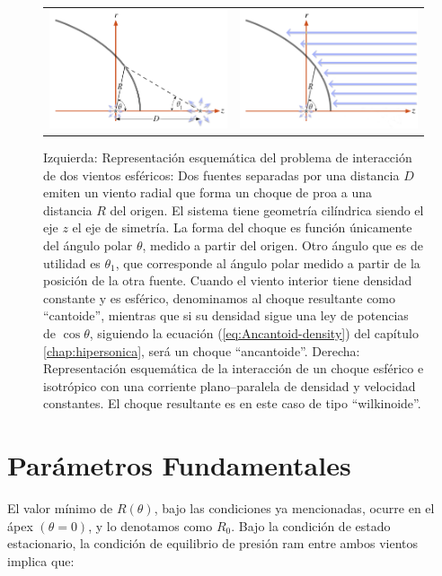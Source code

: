 \begin{figure}
  \begin{tabular}{lr}
    \includegraphics[width=0.45\linewidth]{./Figures/bowshock-crw-variables} &
    \includegraphics[width=0.45\linewidth]{./Figures/wilkinoid}
  \end{tabular}
  \caption{Izquierda: Representación esquemática del problema de interacción de dos vientos esféricos: Dos fuentes separadas por una distancia $D$ emiten un viento radial que forma un choque de proa a una distancia $R$ del origen. El sistema tiene geometría cilíndrica siendo el eje $z$ el eje de simetría. La forma del choque es función únicamente del ángulo polar $\theta$, medido a partir del origen. Otro ángulo que es de utilidad es $\theta_1$, que corresponde al ángulo polar medido a partir de la posición de la otra fuente. Cuando el viento interior tiene densidad constante y es esférico, denominamos al choque resultante como ``cantoide'', mientras que si su densidad sigue una ley de potencias de $\cos\theta$, siguiendo la ecuación (\ref{eq:Ancantoid-density}) del capítulo \ref{chap:hipersonica}, será un choque ``ancantoide''. Derecha: Representación esquemática de la interacción de un choque esférico e isotrópico con una corriente plano--paralela de densidad y velocidad constantes. El choque resultante es en este caso de tipo ``wilkinoide''.}
    \label{fig:crw-esquema}
\end{figure}

\section{Parámetros Fundamentales}

El valor mínimo de $R(\theta)$, bajo las condiciones ya mencionadas, ocurre en el ápex $(\theta=0)$, y lo denotamos como $R_0$. Bajo la condición de estado estacionario, la condición de equilibrio de presión ram entre ambos vientos implica que:

